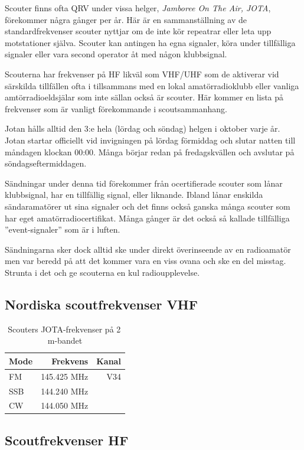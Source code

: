 Scouter finns ofta QRV under vissa helger, \textit{Jamboree On The Air, JOTA},
förekommer några gånger per år. Här är en sammanställning av de
standardfrekvenser scouter nyttjar om de inte kör repeatrar eller leta upp
motstationer själva. Scouter kan antingen ha egna signaler, köra under
tillfälliga signaler eller vara second operator åt med någon klubbsignal.

Scouterna har frekvenser på HF likväl som VHF/UHF som de aktiverar vid
särskilda tillfällen ofta i tillsammans med en lokal amatörradioklubb eller
vanliga amtörradioeldsjälar som inte sällan också är scouter. Här kommer en
lista på frekvenser som är vanligt förekommande i scoutsammanhang.

Jotan hålls alltid den 3:e hela (lördag och söndag) helgen i oktober varje år.
Jotan startar officiellt vid invigningen på lördag förmiddag och slutar natten
till måndagen klockan 00:00. Många börjar redan på fredagskvällen och avslutar
på söndagseftermiddagen.

Sändningar under denna tid förekommer från ocertifierade scouter som lånar
klubbsignal, har en tillfällig signal, eller liknande. Ibland lånar
enskilda sändaramatörer ut sina signaler och det finns också ganska många
scouter som har eget amatörradiocertifikat. Många gånger är det också så
kallade tillfälliga ''event-signaler'' som är i luften.

Sändningarna sker dock alltid ske under direkt överinseende av en radioamatör
men var beredd på att det kommer vara en viss ovana och ske en del misstag.
Strunta i det och ge scouterna en kul radioupplevelse.

\subsection{Nordiska scoutfrekvenser VHF}

\begin{table}[h]
\centering
\begin{tabular}{lrr}
	\textbf{Mode} & \textbf{Frekvens} & \textbf{Kanal} \\ \hline
	FM            &      145.425  MHz &   V34 \\
	SSB           &      144.240  MHz &  \\
	CW            &      144.050  MHz &
\end{tabular}
\caption{Scouters JOTA-frekvenser på 2\,m-bandet}
\end{table}

\subsection{Scoutfrekvenser HF}

